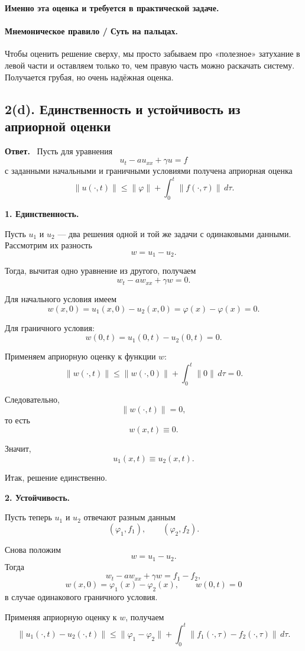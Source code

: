 \documentclass[a4paper,12pt]{article}
\newcommand{\Answer}{\textbf{Ответ.}\ }
\begin{document}
\textbf{Именно эта оценка и требуется в практической задаче.}

\paragraph{Мнемоническое правило / Суть на пальцах.}
Чтобы оценить решение сверху, мы просто забываем про «полезное» затухание в левой части и оставляем только то, чем правую часть можно раскачать систему. Получается грубая, но очень надёжная оценка.

\subsection*{2(d). Единственность и устойчивость из априорной оценки}

\Answer
Пусть для уравнения
\[
u_t-a u_{xx}+\gamma u=f
\]
с заданными начальными и граничными условиями получена априорная оценка
\[
\|u(\cdot,t)\|
\le
\|\varphi\|
+\int_0^t \|f(\cdot,\tau)\|\,d\tau.
\]

\textbf{1. Единственность.}

Пусть $u_1$ и $u_2$ --- два решения одной и той же задачи с одинаковыми данными. Рассмотрим их разность
\[
w=u_1-u_2.
\]

Тогда, вычитая одно уравнение из другого, получаем
\[
w_t-a w_{xx}+\gamma w=0.
\]

Для начального условия имеем
\[
w(x,0)=u_1(x,0)-u_2(x,0)=\varphi(x)-\varphi(x)=0.
\]

Для граничного условия:
\[
w(0,t)=u_1(0,t)-u_2(0,t)=0.
\]

Применяем априорную оценку к функции $w$:
\[
\|w(\cdot,t)\|
\le
\|w(\cdot,0)\|
+\int_0^t \|0\|\,d\tau=0.
\]

Следовательно,
\[
\|w(\cdot,t)\|=0,
\]
то есть
\[
w(x,t)\equiv 0.
\]

Значит,
\[
u_1(x,t)\equiv u_2(x,t).
\]

Итак, решение единственно.

\textbf{2. Устойчивость.}

Пусть теперь $u_1$ и $u_2$ отвечают разным данным
\[
(\varphi_1,f_1),
\qquad
(\varphi_2,f_2).
\]

Снова положим
\[
w=u_1-u_2.
\]
Тогда
\[
w_t-a w_{xx}+\gamma w=f_1-f_2,
\]
\[
w(x,0)=\varphi_1(x)-\varphi_2(x),
\qquad
w(0,t)=0
\]
в случае одинакового граничного условия.

Применяя априорную оценку к $w$, получаем
\[
\|u_1(\cdot,t)-u_2(\cdot,t)\|
\le
\|\varphi_1-\varphi_2\|
+\int_0^t \|f_1(\cdot,\tau)-f_2(\cdot,\tau)\|\,d\tau.
\]
\end{document}
